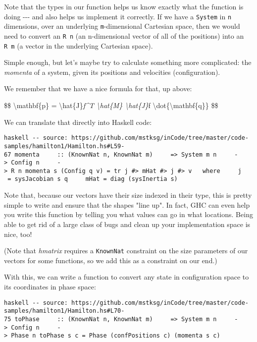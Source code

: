 \documentclass[]{article}
\begin{document}
Note that the types in our function helps us know exactly what the function is
doing -\/-\/- and also helps us implement it correctly. If we have a
\texttt{System} in \texttt{n} dimensions, over an underlying
\texttt{m}-dimensional Cartesian space, then we would need to convert an
\texttt{R\ n} (an n-dimensional vector of all of the positions) into an
\texttt{R\ m} (a vector in the underlying Cartesian space).

Simple enough, but let's maybe try to calculate something more complicated: the
\emph{momenta} of a system, given its positions and velocities (configuration).

We remember that we have a nice formula for that, up above:

\$\$ \textbackslash{}mathbf\{p\} = \textbackslash{}hat\{J\}\emph{f\^{}T
\textbackslash{}hat\{M\} \textbackslash{}hat\{J\}}f
\textbackslash{}dot\{\textbackslash{}mathbf\{q\}\} \$\$

We can translate that directly into Haskell code:

\texttt{haskell\ -\/-\ source:\ https://github.com/mstksg/inCode/tree/master/code-samples/hamilton1/Hamilton.hs\#L59-67\ momenta\ \ \ \ \ ::\ (KnownNat\ n,\ KnownNat\ m)\ \ \ \ \ =\textgreater{}\ System\ m\ n\ \ \ \ \ -\textgreater{}\ Config\ n\ \ \ \ \ -\textgreater{}\ R\ n\ momenta\ s\ (Config\ q\ v)\ =\ tr\ j\ \#\textgreater{}\ mHat\ \#\textgreater{}\ j\ \#\textgreater{}\ v\ \ \ where\ \ \ \ \ j\ \ \ \ =\ sysJacobian\ s\ q\ \ \ \ \ mHat\ =\ diag\ (sysInertia\ s)}

Note that, because our vectors have their size indexed in their type, this is
pretty simple to write and ensure that the shapes "line up". In fact, GHC can
even help you write this function by telling you what values can go in what
locations. Being able to get rid of a large class of bugs and clean up your
implementation space is nice, too!

(Note that \emph{hmatrix} requires a \texttt{KnownNat} constraint on the size
parameters of our vectors for some functions, so we add this as a constraint on
our end.)

With this, we can write a function to convert any state in configuration space
to its coordinates in phase space:

\texttt{haskell\ -\/-\ source:\ https://github.com/mstksg/inCode/tree/master/code-samples/hamilton1/Hamilton.hs\#L70-75\ toPhase\ \ \ \ \ ::\ (KnownNat\ n,\ KnownNat\ m)\ \ \ \ \ =\textgreater{}\ System\ m\ n\ \ \ \ \ -\textgreater{}\ Config\ n\ \ \ \ \ -\textgreater{}\ Phase\ n\ toPhase\ s\ c\ =\ Phase\ (confPositions\ c)\ (momenta\ s\ c)}
\end{document}
